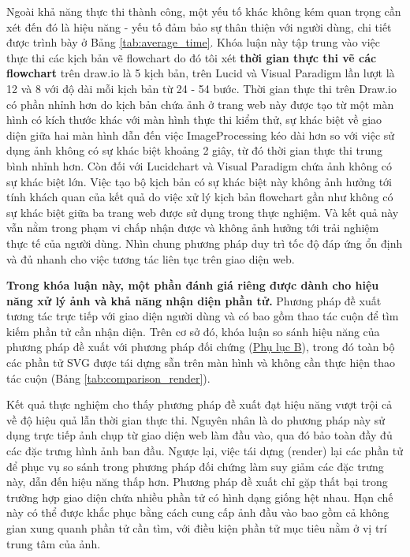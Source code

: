 \documentclass[a4paper, 12pt]{report}
\begin{document}
{Ngoài khả năng thực thi thành công, một yếu tố khác không kém quan trọng cần xét đến đó là hiệu năng - yếu tố đảm bảo sự thân thiện với người dùng, chi tiết được trình bày ở Bảng \ref{tab:average_time}. Khóa luận này tập trung vào việc thực thi các kịch bản vẽ flowchart do đó tôi xét \textbf{thời gian thực thi vẽ các flowchart} trên draw.io là 5 kịch bản, trên Lucid và Visual Paradigm lần lượt là 12 và 8 với độ dài mỗi kịch bản từ 24 - 54 bước. Thời gian thực thi trên Draw.io có phần nhỉnh hơn do kịch bản chứa ảnh ở trang web này được tạo từ một màn hình có kích thước khác với màn hình thực thi kiểm thử, sự khác biệt về giao diện giữa hai màn hình dẫn đến việc \gls{ImageProcessing} kéo dài hơn so với việc sử dụng ảnh không có sự khác biệt khoảng 2 giây, từ đó thời gian thực thi trung bình nhỉnh hơn. Còn đối với Lucidchart và Visual Paradigm chứa ảnh không có sự khác biệt lớn. Việc tạo bộ kịch bản có sự khác biệt này không ảnh hưởng tới tính khách quan của kết quả do việc xử lý kịch bản flowchart gần như không có sự khác biệt giữa ba trang web được sử dụng trong thực nghiệm. Và kết quả này vẫn nằm trong phạm vi chấp nhận được và không ảnh hưởng tới trải nghiệm thực tế của người dùng. Nhìn chung phương pháp duy trì tốc độ đáp ứng ổn định và đủ nhanh cho việc tương tác liên tục trên giao diện web.



\textbf{Trong khóa luận này, một phần đánh giá riêng được dành cho hiệu năng xử lý ảnh và khả năng nhận diện phần tử.} Phương pháp đề xuất tương tác trực tiếp với giao diện người dùng và có bao gồm thao tác cuộn để tìm kiếm phần tử cần nhận diện. Trên cơ sở đó, khóa luận so sánh hiệu năng của phương pháp đề xuất với phương pháp đối chứng (\hyperref[appendix:doichung]{Phụ lục B}), trong đó toàn bộ các phần tử SVG được tái dựng sẵn trên màn hình và không cần thực hiện thao tác cuộn (Bảng \ref{tab:comparison_render}). 

Kết quả thực nghiệm cho thấy phương pháp đề xuất đạt hiệu năng vượt trội cả về độ hiệu quả lẫn thời gian thực thi. Nguyên nhân là do phương pháp này sử dụng trực tiếp ảnh chụp từ giao diện web làm đầu vào, qua đó bảo toàn đầy đủ các đặc trưng hình ảnh ban đầu. Ngược lại, việc tái dựng (render) lại các phần tử để phục vụ so sánh trong phương pháp đối chứng làm suy giảm các đặc trưng này, dẫn đến hiệu năng thấp hơn. Phương pháp đề xuất chỉ gặp thất bại trong trường hợp giao diện chứa nhiều phần tử có hình dạng giống hệt nhau. Hạn chế này có thể được khắc phục bằng cách cung cấp ảnh đầu vào bao gồm cả không gian xung quanh phần tử cần tìm, với điều kiện phần tử mục tiêu nằm ở vị trí trung tâm của ảnh.

}
\end{document}

